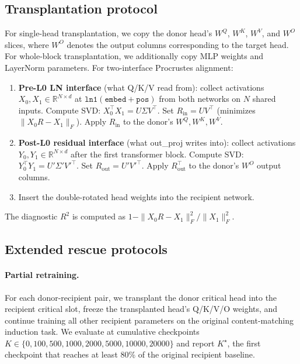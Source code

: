 \documentclass[final]{article}
\begin{document}
\subsection{Transplantation protocol}

For single-head transplantation, we copy the donor head's $W^Q$, $W^K$, $W^V$,
and $W^O$ slices, where $W^O$ denotes the output columns corresponding to the
target head. For whole-block transplantation, we additionally copy MLP weights
and LayerNorm parameters. For two-interface Procrustes alignment:
\begin{enumerate}
  \item \textbf{Pre-L0 LN interface} (what Q/K/V read from): collect
        activations $X_0, X_1 \in \mathbb{R}^{N \times d}$ at
        $\mathtt{ln1(embed + pos)}$ from both networks on $N$ shared inputs.
        Compute SVD: $X_0^\top X_1 = U \Sigma V^\top$.
        Set $R_{\mathrm{in}} = UV^\top$ (minimizes $\|X_0 R - X_1\|_F$).
        Apply $R_{\mathrm{in}}$ to the donor's $W^Q, W^K, W^V$.
  \item \textbf{Post-L0 residual interface} (what out\_proj writes into):
        collect activations $Y_0, Y_1 \in \mathbb{R}^{N \times d}$ after the
        first transformer block.
        Compute SVD: $Y_0^\top Y_1 = U' \Sigma' V'^\top$.
        Set $R_{\mathrm{out}} = U'V'^\top$.
        Apply $R_{\mathrm{out}}^\top$ to the donor's $W^O$ output columns.
  \item Insert the double-rotated head weights into the recipient network.
\end{enumerate}
The diagnostic $R^2$ is computed as $1 - \|X_0 R - X_1\|_F^2 / \|X_1\|_F^2$.

\subsection{Extended rescue protocols}

\paragraph{Partial retraining.}
For each donor-recipient pair, we transplant the donor critical head into the
recipient critical slot, freeze the transplanted head's Q/K/V/O weights, and
continue training all other recipient parameters on the original
content-matching induction task. We evaluate at cumulative checkpoints
$K \in \{0,100,500,1000,2000,5000,10000,20000\}$ and report
$K^\star$, the first checkpoint that reaches at least 80\% of the original
recipient baseline.
\end{document}
